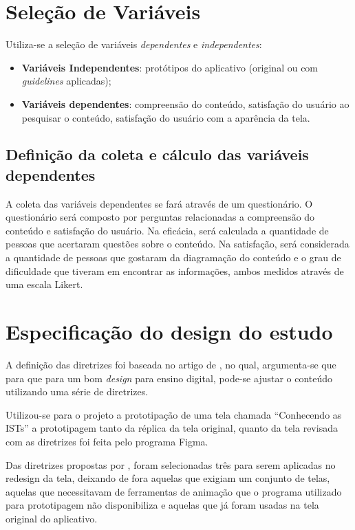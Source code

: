 \documentclass[12pt]{article}
\begin{document}
\section{Seleção de Variáveis}

Utiliza-se a seleção de variáveis \textit{dependentes} e \textit{independentes}:

\begin{itemize}
	\item \textbf{Variáveis Independentes}: protótipos do aplicativo (original ou com \textit{guidelines} aplicadas); 
	\item \textbf{Variáveis dependentes}: compreensão do conteúdo, satisfação do usuário ao pesquisar o conteúdo, satisfação do usuário com a aparência da tela.
\end{itemize}

\subsection{Definição da coleta e cálculo das variáveis dependentes}

A coleta das variáveis dependentes se fará através de um questionário. O questionário será composto por perguntas relacionadas a compreensão do conteúdo e satisfação do usuário. Na eficácia, será calculada a quantidade de pessoas que acertaram questões sobre o conteúdo. Na satisfação, será considerada a quantidade de pessoas que gostaram da diagramação do conteúdo e o grau de dificuldade que tiveram em encontrar as informações, ambos medidos através de uma escala Likert.

\section{Especificação do design do estudo}

A definição das diretrizes foi baseada no artigo de \cite{JIN2013248}, no qual, argumenta-se que para que para um bom \textit{design} para ensino digital, pode-se ajustar o conteúdo utilizando uma série de diretrizes.

Utilizou-se para o projeto a prototipação de uma tela chamada ``Conhecendo as ISTs'' a prototipagem tanto da réplica da tela original, quanto da tela revisada com as diretrizes foi feita pelo programa Figma.

Das diretrizes propostas por \cite{JIN2013248}, foram selecionadas três para serem aplicadas no redesign da tela, deixando de fora aquelas que exigiam um conjunto de telas, aquelas que necessitavam de ferramentas de animação que o programa utilizado para prototipagem não disponibiliza e aquelas que já foram usadas na tela original do aplicativo.
\end{document}
